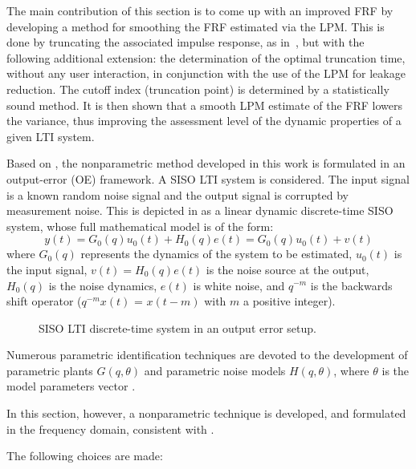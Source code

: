 The main contribution of this section is to come up with an improved \gls{FRF} by developing a method for smoothing the \gls{FRF} estimated via the LPM. This is done by truncating the associated impulse response, as in~\citep{Schoukens1998}, but with the following additional extension: the determination of the optimal truncation time, without any user interaction, in conjunction with the use of the \gls{LPM} for leakage reduction. The cutoff index (truncation point) is determined by a statistically sound method. It is then shown that a smooth \gls{LPM} estimate of the \gls{FRF} lowers the variance, thus improving the assessment level of the dynamic properties of a given LTI system.

Based on \citep{Schoukens2009LPM}, the nonparametric method developed in this work is formulated in an output-error (OE) framework. A \gls{SISO} \gls{LTI} system is considered.
The input signal is a known random noise signal and the output signal is corrupted by measurement noise. This is depicted in  as a linear dynamic discrete-time \gls{SISO} system, whose full mathematical model is of the form:
\begin{equation}\label{eq:nparam:trunc:LPM:TD}
y(t)=G_0(q)u_0(t)+H_0(q)e(t)=G_0(q)u_0(t)+v(t)
\end{equation}
where $G_0(q)$ represents the dynamics of the system to be estimated, $u_0(t)$ is the input signal, $v(t)= H_0(q)e(t)$ is the noise source at the output, $H_0(q)$ is the noise dynamics, $e(t)$ is white noise, and $q^{-m}$ is the backwards shift operator ($q^{-m}x(t)$ = $x(t-m)$  with $m$ a positive integer).

\begin{figure}
\centering
\setlength{}
\setlength\figureheight{0.68\figurewidth}

\caption{SISO LTI discrete-time system in an output error setup.}
\label{lpmtdrep}
\end{figure}

Numerous parametric identification techniques are devoted to the development of parametric plants $G(q,\theta)$ and parametric noise models  $H(q,\theta)$, where  $\theta$ is the model parameters vector  \citep{Ljung1999,Soderstrom1989}.

In this section, however, a nonparametric technique is developed, and
formulated in the frequency domain, consistent with \citep{Pintelon2012,Mahata2006}. 

The following  choices are made:

